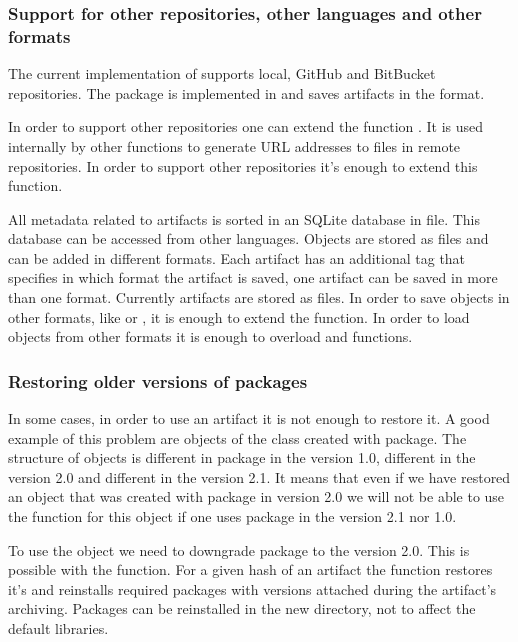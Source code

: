 \documentclass[nojss]{jss}\usepackage[]{graphicx}\usepackage[]{color}
\begin{document}
\subsubsection{Support for other repositories, other languages and other formats}

  
The current implementation of  supports local, GitHub and BitBucket repositories. The package is implemented in  and saves artifacts in the  format. 

In order to support other repositories one can extend the function . It is used internally by other  functions to generate URL addresses to files in remote repositories. In order to support other repositories it's enough to extend this function.

All metadata related to artifacts is sorted in an SQLite database in  file. This database can be accessed from other languages. Objects are stored as files and can be added in different formats. Each artifact has an additional tag  that specifies in which format the artifact is saved, one artifact can be saved in more than one format. Currently artifacts are stored as  files. In order to save objects in other formats, like  or , it is enough to extend the  function. In order to load objects from other formats it is enough to overload  and  functions.


\subsubsection{Restoring older versions of packages}

  
In some cases, in order to use an artifact it is not enough to restore it. A good example of this problem are objects of the  class created with  package. The structure of  objects is different in package  in the version 1.0, different in the version 2.0 and different in the version 2.1. It means that even if we have restored an object that was created with package in version 2.0 we will not be able to use the  function for this object if one uses  package in the version 2.1 nor 1.0.

To use the object we need to downgrade  package to the version 2.0. This is possible with the  function. For a given hash of an artifact the  function restores it's  and reinstalls required packages with versions attached during the artifact's archiving. Packages can be reinstalled in the new directory, not to affect the default  libraries.
\end{document}
